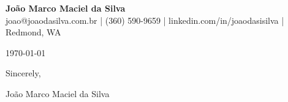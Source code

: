 \documentclass[11pt,letterpaper]{article}
\newcommand{\MYNAME}{João Marco Maciel da Silva}
\begin{document}
\begin{center}
\textbf{\Large{\MYNAME}}\\
joao@joaodasilva.com.br | (360) 590-9659 | linkedin.com/in/joaodasisilva | Redmond, WA
\end{center}

\noindent\today

\vspace{0.3cm}



\vspace{0.3cm}

\noindent Sincerely,

\vspace{0.4cm}

\noindent \MYNAME
\end{document}
